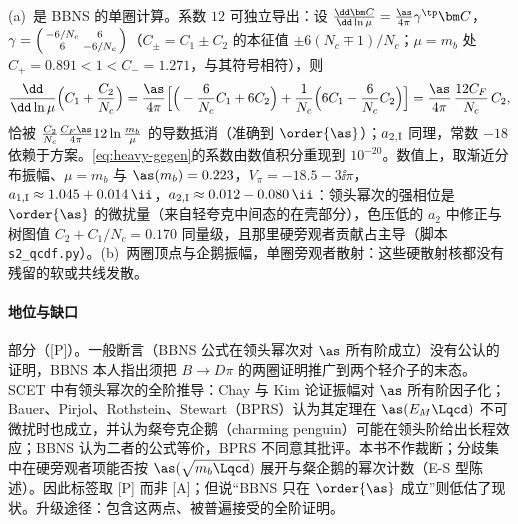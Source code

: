 \begin{proofsketch}
(a)~是 BBNS 的单圈计算\cite[式~(46)--(48)]{BenekeEtAl2001}。系数 $12$ 可独立导出：设 $\frac{\dd\bm C}{\dd\ln\mu}=\frac{\as}{4\pi}\gamma^{\tp}\bm C$，$\gamma=\begin{psmallmatrix}-6/N_c&6\\6&-6/N_c\end{psmallmatrix}$（$C_\pm=C_1\pm C_2$ 的本征值 $\pm6(N_c\mp1)/N_c$；$\mu=m_b$ 处 $C_+=0.891<1<C_-=1.271$，与其符号相符），则
\begin{equation}\label{eq:heavy-a1-rg}
\frac{\dd}{\dd\ln\mu}\Big(C_1+\frac{C_2}{N_c}\Big)=\frac{\as}{4\pi}\Big[\Big(-\frac{6}{N_c}C_1+6C_2\Big)+\frac1{N_c}\Big(6C_1-\frac6{N_c}C_2\Big)\Big]=\frac{\as}{4\pi}\,\frac{12C_F}{N_c}\,C_2 ,
\end{equation}
恰被 $\frac{C_2}{N_c}\frac{C_F\as}{4\pi}12\ln\frac{m_b}{\mu}$ 的导数抵消（准确到 $\order{\as}$）；$a_{2,\rm I}$ 同理，常数 $-18$ 依赖于方案。\cref{eq:heavy-gegen}的系数由数值积分重现到 $10^{-20}$。数值上，取渐近分布振幅、$\mu=m_b$ 与 $\as(m_b)=0.223$，$V_\pi=-18.5-3\ii\pi$，$a_{1,\rm I}\approx1.045+0.014\,\ii$，$a_{2,\rm I}\approx0.012-0.080\,\ii$：领头幂次的强相位是 $\order{\as}$ 的微扰量（来自轻夸克中间态的在壳部分），色压低的 $a_2$ 中修正与树图值 $C_2+C_1/N_c=0.170$ 同量级，且那里硬旁观者贡献占主导\cite[第~4.2~节]{BenekeEtAl2001}（脚本 \texttt{s2\_\allowbreak qcdf.py}）。(b)~两圈顶点\cite{Bell:2007tv,Bell:2009nk,Beneke:2009ek}与企鹅振幅\cite{Bell:2015koa,Bell:2020qus}，单圈旁观者散射\cite{Beneke:2005vv,Beneke:2006mk,Kivel:2006xc,Pilipp:2007mg,Beneke:2005gs}：这些硬散射核都没有残留的软或共线发散。
\end{proofsketch}

\paragraph{地位与缺口}
部分（[P]）。一般断言（BBNS 公式在领头幂次对 $\as$ 所有阶成立）没有公认的证明，BBNS 本人指出须把 $B\to D\pi$ 的两圈证明推广到两个轻介子的末态\cite[第~8~节]{BenekeEtAl2000}。SCET 中有领头幂次的全阶推导：Chay 与 Kim 论证振幅对 $\as$ 所有阶因子化\cite{Chay:2003ju}；Bauer、Pirjol、Rothstein、Stewart（BPRS）认为其定理在 $\as(E_M\Lqcd)$ 不可微扰时也成立，并认为粲夸克企鹅（charming penguin）可能在领头阶给出长程效应\cite{Bauer:2004tj}；BBNS 认为二者的公式等价\cite{Beneke:2004bn}，BPRS 不同意其批评\cite{Bauer:2005wb}。本书不作裁断；分歧集中在硬旁观者项能否按 $\as(\sqrt{m_b\Lqcd})$ 展开与粲企鹅的幂次计数（E-S 型陈述）。因此标签取 [P] 而非 [A]；但说“BBNS 只在 $\order{\as}$ 成立”则低估了现状。升级途径：包含这两点、被普遍接受的全阶证明。

